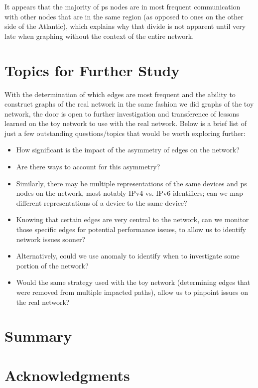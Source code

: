 \documentclass{finalreport}
\begin{document}
It appears that the majority of \gls{ps} nodes are in most frequent communication with other nodes that are in the same region (as opposed to ones on the other side of the Atlantic), which explains why that divide is not apparent until very late when graphing without the context of the entire network. 

\pagebreak
\section*{Topics for Further Study}

With the determination of which edges are most frequent and the ability to construct graphs of the real network in the same fashion we did graphs of the toy network, the door is open to further investigation and transference of lessons learned on the toy network to use with the real network. Below is a brief list of just a few outstanding questions/topics that would be worth exploring further:

\begin{itemize}
	\item How significant is the impact of the asymmetry of edges on the network?
	\item Are there ways to account for this asymmetry?
	\item Similarly, there may be multiple representations of the same devices and \gls{ps} nodes on the network, most notably IPv4 vs. IPv6 identifiers; can we map different representations of a device to the same device?
	\item Knowing that certain edges are very central to the network, can we monitor those specific edges for potential performance issues, to allow us to identify network issues sooner?
	\item Alternatively, could we use \gls{anomaly} to identify when to investigate some portion of the network?
	\item Would the same strategy used with the toy network (determining edges that were removed from multiple impacted paths), allow us to pinpoint issues on the real network?
\end{itemize}

\section{Summary}

\section{Acknowledgments}
\end{document}

